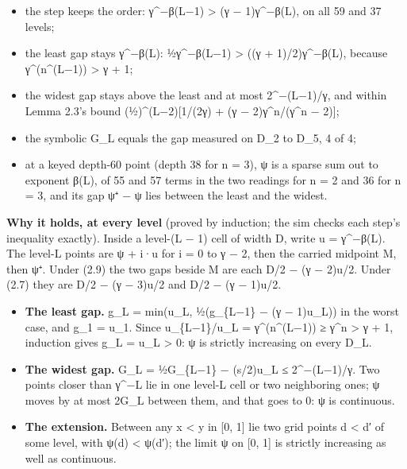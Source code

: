 \begin{enumerate}
\begin{itemize}
\item the step keeps the order: γ\textasciicircum{}−β(L−1) > (γ − 1)γ\textasciicircum{}−β(L), on all 59 and 37 levels;
\item the least gap stays γ\textasciicircum{}−β(L): ½γ\textasciicircum{}−β(L−1) > ((γ + 1)/2)γ\textasciicircum{}−β(L), because γ\textasciicircum{}(n\textasciicircum{}(L−1)) > γ + 1;
\item the widest gap stays above the least and at most 2\textasciicircum{}−(L−1)/γ, and within Lemma 2.3's bound (½)\textasciicircum{}(L−2)[1/(2γ) + (γ − 2)γ\textasciicircum{}n/(γ\textasciicircum{}n − 2)];
\item the symbolic G\_\allowbreak{}L equals the gap measured on D\_\allowbreak{}2 to D\_\allowbreak{}5, 4 of 4;
\item at a keyed depth-60 point (depth 38 for n = 3), ψ is a sparse sum out to exponent β(L), of 55 and 57 terms in the two readings for n = 2 and 36 for n = 3, and its gap ψ⁺ − ψ lies between the least and the widest.
\end{itemize}
\end{enumerate}

\textbf{Why it holds, at every level} (proved by induction; the sim checks each step's inequality exactly). Inside a level-(L − 1) cell of width D, write u = γ\textasciicircum{}−β(L). The level-L points are ψ + i·u for i = 0 to γ − 2, then the carried midpoint M, then ψ⁺. Under (2.9) the two gaps beside M are each D/2 − (γ − 2)u/2. Under (2.7) they are D/2 − (γ − 3)u/2 and D/2 − (γ − 1)u/2.

\begin{itemize}
\item \textbf{The least gap.} g\_\allowbreak{}L = min(u\_\allowbreak{}L, ½(g\_\allowbreak{}\{L−1\} − (γ − 1)u\_\allowbreak{}L)) in the worst case, and g\_\allowbreak{}1 = u\_\allowbreak{}1. Since u\_\allowbreak{}\{L−1\}/u\_\allowbreak{}L = γ\textasciicircum{}(n\textasciicircum{}(L−1)) ≥ γ\textasciicircum{}n > γ + 1, induction gives g\_\allowbreak{}L = u\_\allowbreak{}L > 0: ψ is strictly increasing on every D\_\allowbreak{}L.
\item \textbf{The widest gap.} G\_\allowbreak{}L = ½G\_\allowbreak{}\{L−1\} − (s/2)u\_\allowbreak{}L ≤ 2\textasciicircum{}−(L−1)/γ. Two points closer than γ\textasciicircum{}−L lie in one level-L cell or two neighboring ones; ψ moves by at most 2G\_\allowbreak{}L between them, and that goes to 0: ψ is continuous.
\item \textbf{The extension.} Between any x < y in [0, 1] lie two grid points d < d′ of some level, with ψ(d) < ψ(d′); the limit ψ on [0, 1] is strictly increasing as well as continuous.
\end{itemize}

